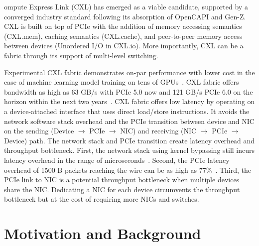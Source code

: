 ompute Express Link (CXL) has emerged as a viable candidate, supported by a converged industry standard following its absorption of OpenCAPI and Gen-Z.
%
CXL is built on top of PCIe with the addition of memory accessing semantics (CXL.mem), caching semantics (CXL.cache), and peer-to-peer memory access between devices (Unordered I/O in CXL.io). 
%
%
More importantly, CXL can be a fabric through its support of multi-level switching.

Experimental CXL fabric demonstrates on-par performance with lower cost in the case of machine learning model training on tens of GPUs~\cite{fabric-saving}.
%
CXL fabric offers bandwidth as high as 63 GB/s with PCIe 5.0 now and 121 GB/s PCIe 6.0 on the horizon within the next two years~\cite{pcie-6-7}.
%
%
CXL fabric offers low latency by operating on a device-attached interface that uses direct load/store instructions.
%
It avoids the network software stack overhead and the PCIe transition between device and NIC on the sending (Device $\rightarrow$ PCIe $\rightarrow$ NIC) and receiving (NIC $\rightarrow$ PCIe $\rightarrow$ Device) path.
%
The network stack and PCIe transition create latency overhead and throughput bottleneck.
%
First, the network stack using kernel bypassing still incurs latency overhead in the range of microseconds~\cite{shinjuku:nsdi:2019, shenango:nsdi:2019, eRPC:nsdi:2019,snap:sosp:2019}.
%
Second, the PCIe latency overhead of 1500 B packets reaching the wire can be as high as 77\%~\cite{pcie-bench:sigcomm:2018}.
%
Third, the PCIe link to NIC is a potential throughput bottleneck when multiple devices share the NIC.
%
Dedicating a NIC for each device circumvents the throughput bottleneck but at the cost of requiring more NICs and switches. %

\section{Motivation and Background}
\label{aurelia:sec:motivation}


